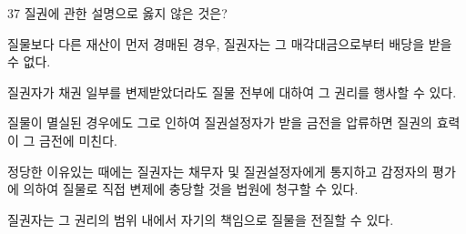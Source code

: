 \begin{question}{37}
질권에 관한 설명으로 옳지 않은 것은?
\begin{choices}
  \item 질물보다 다른 재산이 먼저 경매된 경우, 질권자는 그 매각대금으로부터 배당을 받을 수 없다.
  \item 질권자가 채권 일부를 변제받았더라도 질물 전부에 대하여 그 권리를 행사할 수 있다.
  \item 질물이 멸실된 경우에도 그로 인하여 질권설정자가 받을 금전을 압류하면 질권의 효력이 그 금전에 미친다.
  \item 정당한 이유있는 때에는 질권자는 채무자 및 질권설정자에게 통지하고 감정자의 평가에 의하여 질물로 직접 변제에 충당할 것을 법원에 청구할 수 있다.
  \item 질권자는 그 권리의 범위 내에서 자기의 책임으로 질물을 전질할 수 있다.
\end{choices}
\end{question}

